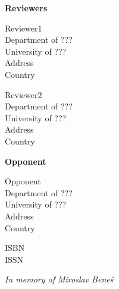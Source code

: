 \documentclass{tucsdissertation}
\begin{document}
\bigskip
\noindent \textbf{\Large Reviewers} \\ \mbox{}

 \parbox[t]{12 cm}{
  Reviewer1\\
  Department of ??? \\
  University of ??? \\
  Address \\
  Country \\ \mbox{}
}

 \parbox[t]{12 cm}{
  Reviewer2\\
  Department of ??? \\
  University of ??? \\
  Address \\
  Country \\ \mbox{}
}

\bigskip
\noindent \textbf{\Large Opponent} \\ \mbox{}

 \parbox[t]{12 cm}{
  Opponent\\
  Department of ??? \\
  University of ??? \\
  Address \\
  Country \\ \mbox{}
}

\vfill
\noindent \parbox[t]{12 cm}{
  ISBN \theisbn \\ 
  ISSN \theissn
}
\clearpage

\pagestyle{plain}
\setcounter{page}{1}


\clearpage



\cleardoublepage


\begin{flushright}\vspace*{10cm}\emph{In memory of Miroslav Bene\v{s}}\end{flushright}
\clearpage

\sloppy

\fussy
\clearpage

\tableofcontents
\cleardoublepage
\pagestyle{fancy}
\renewcommand{\chaptermark}[1]{\markboth{#1}{}}
\renewcommand{\sectionmark}[1]{\markright{\thesection\ #1}}
\fancyhf{}
\fancyhead[LE,RO]{\bfseries\thepage}
\fancyhead[LO]{\bfseries\rightmark}
\fancyhead[RE]{\bfseries\leftmark}
\end{document}
